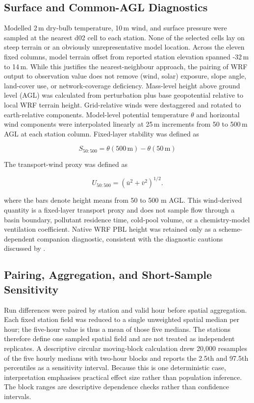 \documentclass[air,article,submit,moreauthors]{Definitions/mdpi}
\begin{document}
\subsection{Surface and Common-AGL Diagnostics}
\label{sec:v3-common-agl}

Modelled 2\,m dry-bulb temperature, 10\,m wind, and surface pressure were sampled at the nearest d02 cell to each station.
None of the selected cells lay on steep terrain or an obviously unrepresentative model location.
Across the eleven fixed columns, model terrain offset from reported station elevation spanned -32\,m to 14\,m.
While this justifies the nearest-neighbour approach, the pairing of WRF output to observation value does not remove (wind, solar) exposure, slope angle, land-cover use, or network-coverage deficiency.
Mass-level height above ground level (AGL) was calculated from perturbation plus base geopotential relative to local WRF terrain height.
Grid-relative winds were destaggered and rotated to earth-relative components.
Model-level potential temperature $\theta$ and horizontal wind components were interpolated linearly at 25\,m increments from 50 to 500\,m AGL at each station column.
Fixed-layer stability was defined as

\begin{equation}
S_{50:500}=\theta(500\,\mathrm{m})-\theta(50\,\mathrm{m})
\end{equation}

The transport-wind proxy was defined as

\begin{equation}
U_{50:500}=\left(\bar{u}^{2}+\bar{v}^{2}\right)^{1/2}.
\end{equation}

where the bars denote height means from 50 to 500 m AGL.
This wind-derived quantity is a fixed-layer transport proxy and does not sample flow through a basin boundary, pollutant residence time, cold-pool volume, or a chemistry-model ventilation coefficient.
Native WRF PBL height was retained only as a scheme-dependent companion diagnostic, consistent with the diagnostic cautions discussed by \citet{Tran2018-ax}.

\subsection{Pairing, Aggregation, and Short-Sample Sensitivity}
\label{sec:v3-aggregation}

Run differences were paired by station and valid hour before spatial aggregation.
Each fixed station field was reduced to a single unweighted spatial median per hour; the five-hour value is thus a mean of those five medians.
The stations therefore define one sampled spatial field and are not treated as independent replicates.
A descriptive circular moving-block calculation drew 20,000 resamples of the five hourly medians with two-hour blocks and reports the 2.5th and 97.5th percentiles as a sensitivity interval.
Because this is one deterministic case, interpretation emphasises practical effect size rather than population inference.
The block ranges are descriptive dependence checks rather than confidence intervals.
\end{document}
